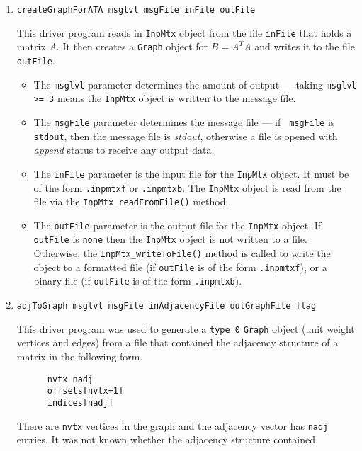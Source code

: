 \begin{enumerate}
\begin{itemize}
\end{itemize}
\item
\begin{verbatim}
createGraphForATA msglvl msgFile inFile outFile
\end{verbatim}
This driver program reads in {\tt InpMtx} object from the file
{\tt inFile} that holds a matrix $A$.
It then creates a {\tt Graph} object for $B = A^TA$
and writes it to the file {\tt outFile}.
\par
\begin{itemize}
\item
The {\tt msglvl} parameter determines the amount of output ---
taking {\tt msglvl >= 3} means the {\tt InpMtx} object is written
to the message file.
\item
The {\tt msgFile} parameter determines the message file --- if {\tt
msgFile} is {\tt stdout}, then the message file is {\it stdout},
otherwise a file is opened with {\it append} status to receive any
output data.
\item
The {\tt inFile} parameter is the input file for the {\tt InpMtx}
object. It must be of the form {\tt *.inpmtxf} or {\tt *.inpmtxb}.
The {\tt InpMtx} object is read from the file via the
{\tt InpMtx\_readFromFile()} method.
\item
The {\tt outFile} parameter is the output file for the {\tt InpMtx}
object. 
If {\tt outFile} is {\tt none} then the {\tt InpMtx} object is not
written to a file. 
Otherwise, the {\tt InpMtx\_writeToFile()} method is called to write
the object to 
a formatted file (if {\tt outFile} is of the form {\tt *.inpmtxf}),
or
a binary file (if {\tt outFile} is of the form {\tt *.inpmtxb}).
\end{itemize}
\item
\begin{verbatim}
adjToGraph msglvl msgFile inAdjacencyFile outGraphFile flag
\end{verbatim}
This driver program was used to generate a {\tt type 0} {\tt Graph} 
object (unit weight vertices and edges) from
a file that contained the adjacency structure of a matrix in the
following form.
\begin{verbatim}
      nvtx nadj
      offsets[nvtx+1]
      indices[nadj]
\end{verbatim}
There are {\tt nvtx} vertices in the graph and the adjacency vector
has {\tt nadj} entries.
It was not known whether the adjacency structure contained 

\end{enumerate}
